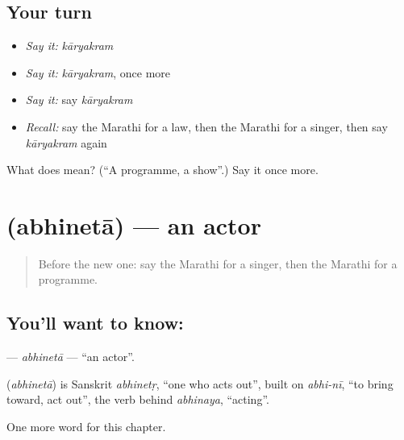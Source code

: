 \subsection*{Your turn}
\begin{itemize}
\raggedright
  \item \emph{Say it:} \emph{kāryakram}
  \item \emph{Say it:} \emph{kāryakram}, once more
  \item \emph{Say it:} say \emph{kāryakram}
  \item \emph{Recall:} say the Marathi for a law, then the Marathi for a singer, then say \emph{kāryakram} again
\end{itemize}

\begin{tcolorbox}[breakable,colback=teal!4,colframe=teal!35!black,title={Before you move on}]
What does  mean? (\textquotedblleft{}A programme, a show\textquotedblright{}.) Say it once more.
\end{tcolorbox}
\section[\texorpdfstring{\mr{अभिनेता} (abhinetā)}{अभिनेता (abhinetā)}]{ (abhinetā) — an actor}

\label{lesson:MR-C263-abhineta}



\begin{quote}
Before the new one: say the Marathi for a singer, then the Marathi for a programme.
\end{quote}

\subsection*{You'll want to know: }
\textbf{} — \emph{abhinetā} — \textquotedblleft{}an actor\textquotedblright{}.

\begin{cousinweb}
\textbf{} (\emph{abhinetā}) is Sanskrit \emph{abhinetṛ}, \textquotedblleft{}one who acts out\textquotedblright{}, built on \emph{abhi-nī}, \textquotedblleft{}to bring toward, act out\textquotedblright{}, the verb behind \emph{abhinaya}, \textquotedblleft{}acting\textquotedblright{}.
\end{cousinweb}

\begin{grammarlens}[title={What you've built}]
One more word for this chapter.
\end{grammarlens}

